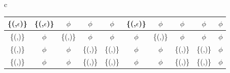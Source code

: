 \begin{figure*}
\begin{tabular}{c}
{\begin{tabular}{|c|c|c|c|c|c|c|c|c|c|}
\{(\fieldI{f}{}{\infty},$\epsilon$)\} & \{(\fieldI{f}{}{m},$\epsilon$)\} & $\phi$ & $\phi$ & $\phi$ & \{(\fieldI{f}{}{\infty},$\epsilon$)\} & $\phi$ & $\phi$ & $\phi$ & $\phi$\\ \hline

\{(\fieldI{f}{}{\infty},\fieldD{g}{})\} & $\phi$ & \{(\fieldI{f}{}{m},\fieldD{g}{})\} & $\phi$ & $\phi$ & $\phi$ & \{(\fieldI{f}{}{\infty},\fieldD{g}{})\} & $\phi$ & $\phi$  & $\phi$\\ \hline

\{(\fieldI{f}{}{\infty},\fieldI{g}{}{y})\} & $\phi$ & $\phi$ & \{(\fieldI{f}{}{m},\fieldI{g}{}{y \star n})\} & \{(\fieldI{f}{}{m},\fieldI{g}{}{y})\} & $\phi$ & $\phi$ & \{(\fieldI{f}{}{\infty},\fieldI{g}{}{y \star n})\} & \{(\fieldI{f}{}{\infty},\fieldI{g}{}{y})\} & $\phi$\\ \hline

\{(\fieldI{f}{}{\infty},\fieldI{g}{}{\infty})\} & $\phi$ & $\phi$ & \{(\fieldI{f}{}{m},\fieldI{g}{}{n})\} & \{(\fieldI{f}{}{m},\fieldI{g}{}{\infty})\} &  $\phi$ &  $\phi$ & \{(\fieldI{f}{}{\infty},\fieldI{g}{}{n})\} & \{(\fieldI{f}{}{\infty},\fieldI{g}{}{\infty})\} & $\phi$\\ \hline

\end{tabular}
}\\
\end{tabular}
\end{figure*}
